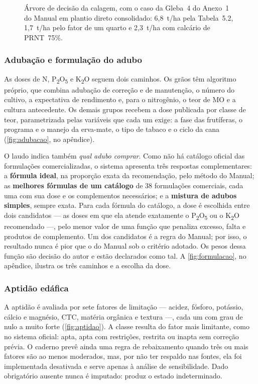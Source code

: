 \begin{figure}[!htbp]
\centering
{}
\caption{Árvore de decisão da calagem, com o caso da Gleba~4 do Anexo~1 do Manual em plantio
direto consolidado: 6,8~t/ha pela Tabela~5.2, 1,7~t/ha pelo fator de um quarto e 2,3~t/ha com
calcário de PRNT~75\%.}
\label{fig:calagem}
\end{figure}

\subsubsection{Adubação e formulação do adubo}

As doses de N, P\textsubscript{2}O\textsubscript{5} e K\textsubscript{2}O seguem dois caminhos.
Os grãos têm algoritmo próprio, que combina adubação de correção e de manutenção, o número do
cultivo, a expectativa de rendimento e, para o nitrogênio, o teor de MO e a cultura antecedente.
Os demais grupos recebem a dose publicada por classe de teor, parametrizada pelas variáveis que
cada um exige: a fase das frutíferas, o programa e o manejo da erva-mate, o tipo de tabaco e o
ciclo da cana (\autoref{fig:adubacao}, no apêndice).

O laudo indica também \emph{qual adubo comprar}. Como não há
catálogo oficial das formulações comercializadas, o sistema apresenta três respostas
complementares: a \textbf{fórmula ideal}, na proporção exata da recomendação, pelo método do
Manual; as \textbf{melhores fórmulas de um catálogo} de 38 formulações comerciais, cada uma com
sua dose e os complementos necessários; e a \textbf{mistura de adubos simples}, sempre exata.
Para cada fórmula do catálogo, a dose é escolhida entre dois candidatos --- as doses em que ela
atende exatamente o P\textsubscript{2}O\textsubscript{5} ou o K\textsubscript{2}O recomendado ---,
pelo menor valor de uma função que penaliza excesso, falta e produtos de complemento. Um dos
candidatos é a regra do Manual; por isso, o resultado nunca é pior que o do Manual sob o critério
adotado. Os pesos dessa função são decisão do autor e estão declarados como tal. A
\autoref{fig:formulacao}, no apêndice, ilustra os três caminhos e a escolha da dose.

\subsubsection{Aptidão edáfica}

A aptidão é avaliada por sete fatores de limitação --- acidez, fósforo, potássio, cálcio e
magnésio, CTC, matéria orgânica e textura ---, cada um com grau de nulo a muito forte
(\autoref{fig:aptidao}). A classe resulta do fator mais limitante, como no sistema oficial:
apta, apta com restrições, restrita ou inapta sem correção prévia. O caderno prevê ainda uma
regra de rebaixamento quando três ou mais fatores são ao menos moderados, mas, por não ter
respaldo nas fontes, ela foi implementada desativada e serve apenas à análise de sensibilidade.
Dado obrigatório ausente nunca é imputado: produz o estado indeterminado.


